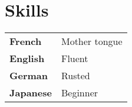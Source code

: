 \documentclass[a4paper]{deedy-resume} %
\begin{document}
\begin{minipage}[t]{0.33\textwidth} %

\section{Skills}


	\begin{tabular}{ll}
		\textbf{French} & Mother tongue \\
		\textbf{English} & Fluent \\
		\textbf{German} & Rusted \\
		\textbf{Japanese} & Beginner \\
	\end{tabular}

\sectionspace


\end{minipage}
\end{document}
